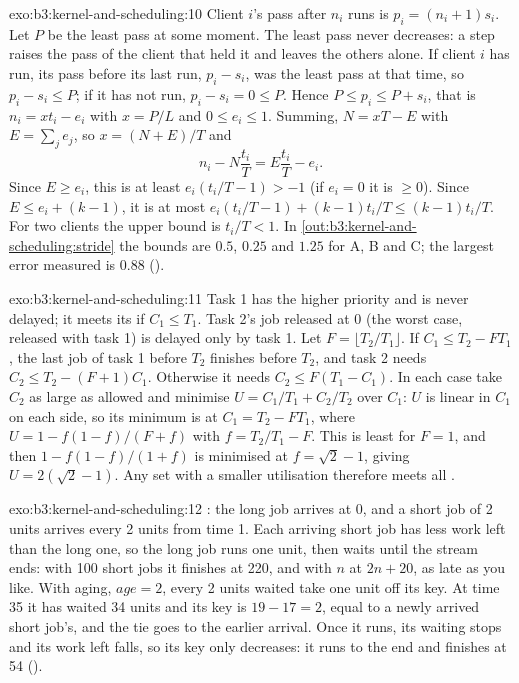 \begin{solution}{exo:b3:kernel-and-scheduling:10}
Client $i$'s pass after $n_i$ runs is $p_i = (n_i + 1)s_i$. Let $P$ be the least pass at some moment. The least pass never decreases: a step raises the pass of the client that held it and leaves the others alone. If client $i$ has run, its pass before its last run, $p_i - s_i$, was the least pass at that time, so $p_i - s_i \le P$; if it has not run, $p_i - s_i = 0 \le P$. Hence $P \le p_i \le P + s_i$, that is $n_i = x t_i - e_i$ with $x = P/L$ and $0 \le e_i \le 1$. Summing, $N = xT - E$ with $E = \sum_j e_j$, so $x = (N + E)/T$ and
\[ n_i - N\frac{t_i}{T} = E\frac{t_i}{T} - e_i. \]
Since $E \ge e_i$, this is at least $e_i(t_i/T - 1) > -1$ (if $e_i = 0$ it is $\ge 0$). Since $E \le e_i + (k - 1)$, it is at most $e_i(t_i/T - 1) + (k - 1)t_i/T \le (k - 1)t_i/T$. For two clients the upper bound is $t_i/T < 1$. In \cref{out:b3:kernel-and-scheduling:stride} the bounds are $0.5$, $0.25$ and $1.25$ for A, B and C; the largest error measured is 0.88 ().
\end{solution}

\begin{solution}{exo:b3:kernel-and-scheduling:11}
Task 1 has the higher priority and is never delayed; it meets its  if $C_1 \le T_1$. Task 2's job released at 0 (the worst case, released with task 1) is delayed only by task 1. Let $F = \lfloor T_2/T_1 \rfloor$. If $C_1 \le T_2 - F T_1$, the last job of task 1 before $T_2$ finishes before $T_2$, and task 2 needs $C_2 \le T_2 - (F + 1)C_1$. Otherwise it needs $C_2 \le F(T_1 - C_1)$. In each case take $C_2$ as large as allowed and minimise $U = C_1/T_1 + C_2/T_2$ over $C_1$: $U$ is linear in $C_1$ on each side, so its minimum is at $C_1 = T_2 - F T_1$, where $U = 1 - f(1 - f)/(F + f)$ with $f = T_2/T_1 - F$. This is least for $F = 1$, and then $1 - f(1 - f)/(1 + f)$ is minimised at $f = \sqrt{2} - 1$, giving $U = 2(\sqrt{2} - 1)$. Any set with a smaller utilisation therefore meets all .
\end{solution}

\begin{solution}{exo:b3:kernel-and-scheduling:12}
: the long job arrives at 0, and a short job of 2 units arrives every 2 units from time 1. Each arriving short job has less work left than the long one, so the long job runs one unit, then waits until the stream ends: with 100 short jobs it finishes at 220, and with $n$ at $2n + 20$, as late as you like. With aging, $\mathit{age} = 2$, every 2 units waited take one unit off its key. At time 35 it has waited 34 units and its key is $19 - 17 = 2$, equal to a newly arrived short job's, and the tie goes to the earlier arrival. Once it runs, its waiting stops and its work left falls, so its key only decreases: it runs to the end and finishes at 54 ().
\end{solution}

